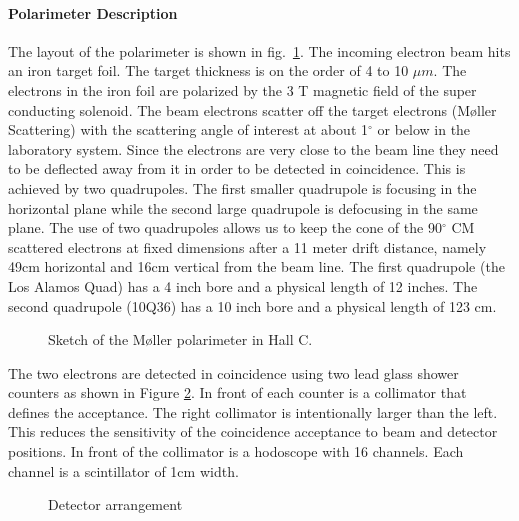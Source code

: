 \paragraph{Polarimeter Description}
The layout of the polarimeter is shown in fig.~\ref{polscetch}.
The incoming electron beam hits an iron target foil. The target thickness
is on the order of 4 to 10 $\mu m$. The electrons in the iron foil
are polarized by the 3 T magnetic field of the super conducting solenoid.
The beam electrons scatter off 
the target electrons (M\o ller Scattering) 
with the scattering angle of interest at about
1$^{\circ}$ or below in the laboratory system. Since the electrons
are very close to the beam line they need to be deflected away from
it in order to be detected in coincidence. This is achieved by
two quadrupoles. The first smaller quadrupole is focusing in the
horizontal plane  while the
second large quadrupole is defocusing in the same plane. The use of two quadrupoles
allows us to keep the cone of the 90$^{\circ}$ CM scattered electrons 
at fixed dimensions after a 11 meter drift distance, namely
49cm horizontal and 16cm vertical from the beam line.
The first quadrupole (the Los Alamos Quad) has a 4 inch bore and a
physical length of 12 inches. The second quadrupole (10Q36) has a 10
inch bore and a physical length of 123 cm.
\begin{figure}[htp]
\begin{center}
\caption{Sketch of the M\o ller polarimeter in Hall C.\label{polscetch}}
\end{center}
\end{figure}
The two electrons are detected in coincidence using two lead glass 
shower counters as shown in Figure \ref{detarr}. In front of each counter is a collimator that defines
the acceptance. The right collimator is intentionally larger
than the left. This reduces the sensitivity of the coincidence 
acceptance to beam and detector positions. In front of the collimator
is a hodoscope with 16 channels. Each channel is a scintillator of 1cm
width.
\begin{figure}
\begin{center}
\parbox{10cm}{
\caption{Detector arrangement}\label{detarr}}
\end{center}
\end{figure}


